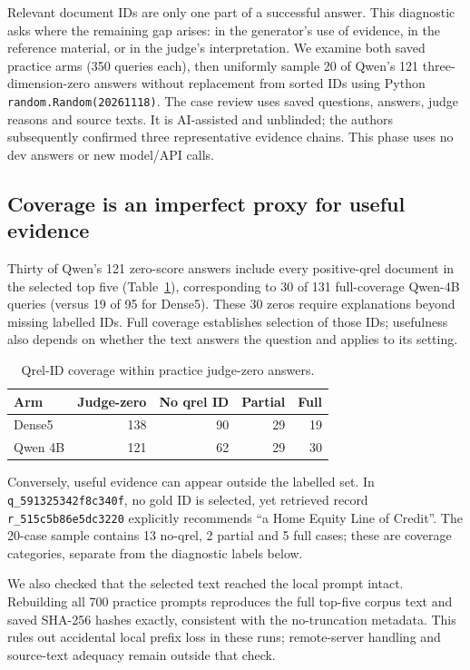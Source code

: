Relevant document IDs are only one part of a successful answer. This diagnostic
asks where the remaining gap arises: in the generator's use of evidence, in
the reference material, or in the judge's interpretation.
We examine both saved practice arms (350 queries each), then uniformly sample
20 of Qwen's 121 three-dimension-zero answers without replacement from sorted
IDs using Python \texttt{random.Random(20261118)}.
The case review uses saved questions, answers, judge reasons and source texts.
It is AI-assisted and unblinded; the authors subsequently confirmed three
representative evidence chains. This phase uses no dev answers or new model/API calls.

\subsection{Coverage is an imperfect proxy for useful evidence}

Thirty of Qwen's 121 zero-score answers include every positive-qrel document
in the selected top five (Table~\ref{tab:error-coverage}), corresponding to
30 of 131 full-coverage Qwen-4B queries (versus 19 of 95 for Dense5).
These 30 zeros require explanations beyond missing labelled IDs.
Full coverage establishes selection of those IDs; usefulness
also depends on whether the text answers the question and applies to its setting.

\begin{table}[ht]
\centering
\caption{Qrel-ID coverage within practice judge-zero answers.}
\label{tab:error-coverage}
\begin{tabular}{@{}lrrrr@{}}
\toprule
Arm & Judge-zero & No qrel ID & Partial & Full \\
\midrule
Dense5 & 138 & 90 & 29 & 19 \\
Qwen 4B & 121 & 62 & 29 & 30 \\
\bottomrule
\end{tabular}
\end{table}

Conversely, useful evidence can appear outside the labelled set.
In \texttt{q\_591325342f8c340f}, no gold ID is selected, yet retrieved record
\texttt{r\_515c5b86e5dc3220} explicitly recommends ``a Home Equity Line of Credit''.
The 20-case sample contains 13 no-qrel, 2 partial and 5 full cases; these are
coverage categories, separate from the diagnostic labels below.

We also checked that the selected text reached the local prompt intact.
Rebuilding all 700 practice prompts reproduces the full top-five corpus text
and saved SHA-256 hashes exactly, consistent with the no-truncation metadata.
This rules out accidental local prefix loss in these runs; remote-server
handling and source-text adequacy remain outside that check.

